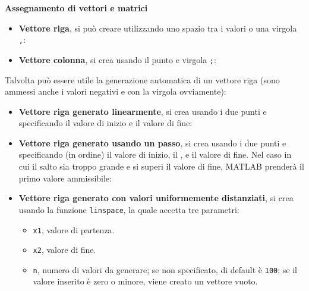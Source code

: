 \begin{flushleft}
    \large
    \hypertarget{
        lab: Assegnamento di vettori e matrici
    }{
        \textcolor{Red3}{\textbf{Assegnamento di vettori e matrici}}
    }
    \label{lab: Assegnamento di vettori e matrici}
\end{flushleft}
\begin{itemize}
    \item \textbf{Vettore riga}, si può creare utilizzando uno spazio tra i valori o una virgola \texttt{,}:
    

    \item \textbf{Vettore colonna}, si crea usando il punto e virgola \texttt{;}:
    
\end{itemize}
Talvolta può essere utile la generazione automatica di un vettore riga (sono ammessi anche i valori negativi e con la virgola ovviamente):
\begin{itemize}
    \item \textbf{Vettore riga generato linearmente}, si crea usando i due punti e specificando il valore di inizio e il valore di fine:
    

    \item \textbf{Vettore riga generato usando un passo}, si crea usando i due punti e specificando (in ordine) il valore di inizio, il , e il valore di fine. Nel caso in cui il salto sia troppo grande e si superi il valore di fine, MATLAB prenderà il primo valore ammissibile:
    

    \item \textbf{Vettore riga generato con valori uniformemente distanziati}, si crea usando la funzione \texttt{linspace}, la quale accetta tre parametri:
    \begin{itemize}
        \item \texttt{x1}, valore di partenza.
        \item \texttt{x2}, valore di fine.
        \item \texttt{n}, numero di valori da generare; se non specificato, di default è \texttt{100}; se il valore inserito è zero o minore, viene creato un vettore vuoto.
    \end{itemize}
    
\end{itemize}
